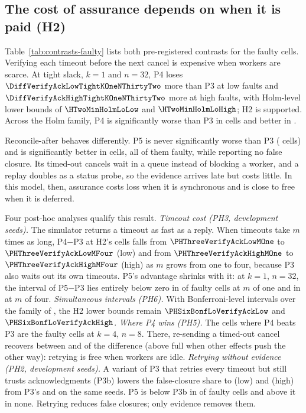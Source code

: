 

\subsection{The cost of assurance depends on when it is paid (H2)}\label{sec:results:h2}
Table~\ref{tab:contrasts-faulty} lists both pre-registered contrasts for the faulty cells. Verifying each timeout before the next cancel is expensive when workers are scarce. At tight slack, $k = 1$ and $n = 32$, P4 loses $\DiffVerifyAckLowTightKOneNThirtyTwo$ more than P3 at low faults and $\DiffVerifyAckHighTightKOneNThirtyTwo$ more at high faults, with Holm-level lower bounds of $\HTwoMinHolmLoLow$ and $\HTwoMinHolmLoHigh$; H2 is supported. Across the Holm family, P4 is significantly worse than P3 in \NHolmHigherVerifyAck{} cells and better in \NHolmLowerVerifyAck.

Reconcile-after behaves differently. P5 is never significantly worse than P3 (\NHolmHigherReconcileAck{} cells) and is significantly better in \NHolmLowerReconcileAck{} cells, all of them faulty, while reporting no false closure. Its timed-out cancels wait in a queue instead of blocking a worker, and a replay doubles as a status probe, so the evidence arrives late but costs little. In this model, then, assurance costs loss when it is synchronous and is close to free when it is deferred.

Four post-hoc analyses qualify this result.
\emph{Timeout cost (PH3, development seeds).} The simulator returns a timeout as fast as a reply. When timeouts take $m$ times as long, P4$-$P3 at H2's cells falls from $\PHThreeVerifyAckLowMOne$ to $\PHThreeVerifyAckLowMFour$ (low) and from $\PHThreeVerifyAckHighMOne$ to $\PHThreeVerifyAckHighMFour$ (high) as $m$ grows from one to four, because P3 also waits out its own timeouts. P5's advantage shrinks with it: at $k = 1$, $n = 32$, the interval of P5$-$P3 lies entirely below zero in \PHThreeReconcileAckKOneNThirtyTwoMOneCellsBelow{} of \PHThreeReconcileAckKOneNThirtyTwoMOneCells{} faulty cells at $m$ of one and in \PHThreeReconcileAckKOneNThirtyTwoMFourCellsBelow{} at $m$ of four.
\emph{Simultaneous intervals (PH6).} With Bonferroni-level intervals over the family of \PHSixFamilySize, the H2 lower bounds remain $\PHSixBonfLoVerifyAckLow$ and $\PHSixBonfLoVerifyAckHigh$.
\emph{Where P4 wins (PH5).} The \PHFiveCellsVerifyBetter{} cells where P4 beats P3 are the faulty cells at $k = 4$, $n = 8$. There, re-sending a timed-out cancel recovers between \PHFiveResendShareHighNormalKFourNEight{} and \PHFiveResendShareLowTightKFourNEight{} of the difference (above full when other effects push the other way): retrying is free when workers are idle.
\emph{Retrying without evidence (PH2, development seeds).} A variant of P3 that retries every timeout but still trusts acknowledgments (P3b) lowers the false-closure share to \PHTwoFCShareAckRetryLow{} (low) and \PHTwoFCShareAckRetryHigh{} (high) from P3's \PHTwoFCShareAckLow{} and \PHTwoFCShareAckHigh{} on the same seeds. P5 is below P3b in \PHTwoReconcileAckRetryCellsBelow{} of \PHTwoReconcileAckRetryCells{} faulty cells and above it in none. Retrying reduces false closures; only evidence removes them.

